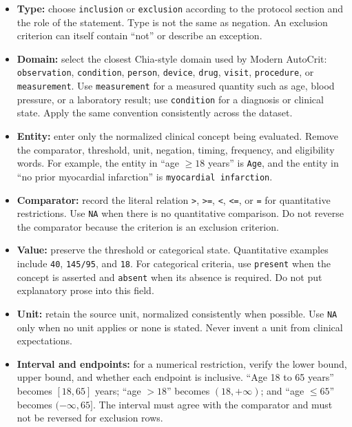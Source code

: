 \documentclass[11pt]{article}
\begin{document}
\begin{itemize}
    \item \textbf{Type:} choose \texttt{inclusion} or \texttt{exclusion} according to the protocol section and the role of the statement. Type is not the same as negation. An exclusion criterion can itself contain ``not'' or describe an exception.

    \item \textbf{Domain:} select the closest Chia-style domain used by Modern AutoCrit: \texttt{observation}, \texttt{condition}, \texttt{person}, \texttt{device}, \texttt{drug}, \texttt{visit}, \texttt{procedure}, or \texttt{measurement}. Use \texttt{measurement} for a measured quantity such as age, blood pressure, or a laboratory result; use \texttt{condition} for a diagnosis or clinical state. Apply the same convention consistently across the dataset.

    \item \textbf{Entity:} enter only the normalized clinical concept being evaluated. Remove the comparator, threshold, unit, negation, timing, frequency, and eligibility words. For example, the entity in ``age $\geq18$ years'' is \texttt{Age}, and the entity in ``no prior myocardial infarction'' is \texttt{myocardial infarction}.

    \item \textbf{Comparator:} record the literal relation \texttt{>}, \texttt{>=}, \texttt{<}, \texttt{<=}, or \texttt{=} for quantitative restrictions. Use \texttt{NA} when there is no quantitative comparison. Do not reverse the comparator because the criterion is an exclusion criterion.

    \item \textbf{Value:} preserve the threshold or categorical state. Quantitative examples include \texttt{40}, \texttt{145/95}, and \texttt{18}. For categorical criteria, use \texttt{present} when the concept is asserted and \texttt{absent} when its absence is required. Do not put explanatory prose into this field.

    \item \textbf{Unit:} retain the source unit, normalized consistently when possible. Use \texttt{NA} only when no unit applies or none is stated. Never invent a unit from clinical expectations.

    \item \textbf{Interval and endpoints:} for a numerical restriction, verify the lower bound, upper bound, and whether each endpoint is inclusive. ``Age 18 to 65 years'' becomes $[18,65]$ years; ``age $>18$'' becomes $(18,+\infty)$; and ``age $\leq65$'' becomes $(-\infty,65]$. The interval must agree with the comparator and must not be reversed for exclusion rows.


\end{itemize}
\end{document}
